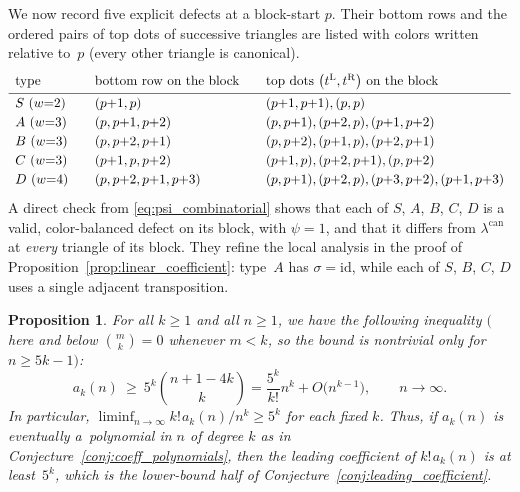 \documentclass[10pt,a4paper]{amsart}
\numberwithin{equation}{section}
\newcommand{\ssp}{\hspace{1pt}}
\newtheorem{Proposition}[Theorem]{Proposition}
\theoremstyle{definition}
\begin{document}
We now record five explicit defects at a block-start $p$. Their bottom rows and
the ordered pairs of top dots of successive triangles are listed with colors
written relative to~$p$ (every other triangle is canonical).
\begin{equation}
	\label{eq:five_defects}
	\renewcommand{\arraystretch}{1.2}
	\begin{array}{l@{\qquad}l@{\qquad}l}
		\text{type} & \text{bottom row on the block} & \text{top dots $\bigl(t^{\mathrm L},t^{\mathrm R}\bigr)$ on the block}\\[2pt]\hline
		S\ (w{=}2) & (p{+}1,p) & (p{+}1,p{+}1),(p,p)\\
		A\ (w{=}3) & (p,p{+}1,p{+}2) & (p,p{+}1),(p{+}2,p),(p{+}1,p{+}2)\\
		B\ (w{=}3) & (p,p{+}2,p{+}1) & (p,p{+}2),(p{+}1,p),(p{+}2,p{+}1)\\
		C\ (w{=}3) & (p{+}1,p,p{+}2) & (p{+}1,p),(p{+}2,p{+}1),(p,p{+}2)\\
		D\ (w{=}4) & (p,p{+}2,p{+}1,p{+}3) & (p,p{+}1),(p{+}2,p),(p{+}3,p{+}2),(p{+}1,p{+}3)
	\end{array}
\end{equation}
A direct check from \eqref{eq:psi_combinatorial} shows that each of
$S$, $A$, $B$, $C$, $D$ is a valid, color-balanced defect on its block, with $\psi=1$, and
that it differs from $\lambda^{\mathrm{can}}$ at \emph{every} triangle of its
block. They refine the local analysis in the proof of
Proposition~\ref{prop:linear_coefficient}: type~$A$ has $\sigma=\mathrm{id}$, while each of
$S$, $B$, $C$, $D$ uses a single adjacent transposition.

\begin{Proposition}
	\label{prop:leading_lower_bound}
	For all $k\ge 1$ and all $n\ge 1$, we have
	the following inequality $($here and below $\binom{m}{k}=0$ whenever $m<k$,
	so the bound is nontrivial only for $n\ge 5k-1)$:
	\begin{equation}
		\label{eq:leading_lower_bound}
		a_k(n)\ \ge\ 5^{k}\binom{n+1-4k}{k}
		 = \frac{5^{k}}{k!} n^{k}+O \bigl(n^{k-1}\bigr),
		\qquad n\to\infty.
	\end{equation}
	In particular, $\liminf_{n\to\infty}k!\ssp a_k(n)/n^{k}\ge 5^{k}$ for each
	fixed $k$. Thus, if $a_k(n)$ is eventually a~polynomial in $n$ of degree $k$
	as in Conjecture~{\rm \ref{conj:coeff_polynomials}}, then the leading coefficient of
	$k!\ssp a_k(n)$ is at least~$5^{k}$, which is the lower-bound half of
	Conjecture~{\rm \ref{conj:leading_coefficient}}.
\end{Proposition}
\end{document}
